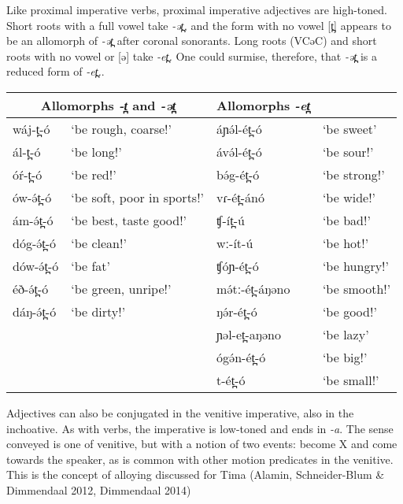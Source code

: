
Like proximal imperative verbs, proximal imperative adjectives are high-toned. Short roots with a full vowel take \textit{-ət̪,} and the form with no vowel [t̪] appears to be an allomorph of \textit{-ət̪ } after coronal sonorants. Long roots (VCəC) and short roots with no vowel or [ə] take \textit{-et̪.} One could surmise, therefore, that \textit{-ət̪ } is a reduced form of \textit{-et̪.}. %

\ea 
\begin{tabular}[t]{llll}
\multicolumn{2}{c}{Allomorphs \textit{-t̪} and \textit{-ət̪}} & Allomorphs \textit{-et̪}\\
\midrule
wáj-t̪-ó  	& ‘be rough, coarse!’ & áɲə́l-ét̪-ó 	& ‘be sweet’\\
ál-t̪-ó  	& ‘be long!’ & ávə́l-ét̪-ó	& ‘be sour!’\\
óŕ-t̪-ó  	& ‘be red!’ & bə́g-ét̪-ó 	& ‘be strong!’\\
ów-ə́t̪-ó  	& ‘be soft, poor in sports!’ & vɾ-ét̪-ánó 	& ‘be wide!’\\
ám-ə́t̪-ó  	& ‘be best, taste good!’ & ʧ-ít̪-ú	 	& ‘be bad!’\\
dóg-ə́t̪-ó  	& ‘be clean!’ & wː-ít-ú 	& ‘be hot!’\\
dów-ə́t̪-ó 	& ‘be fat’ & ʧóɲ-ét̪-ó 	& ‘be hungry!’\\
éð-ə́t̪-ó 	& ‘be green, unripe!’ & mə́tː-ét̪-áŋəno & ‘be smooth!’\\
dáŋ-ə́t̪-ó 	& ‘be dirty!’ & ŋə́r-ét̪-ó	 & ‘be good!’\\
& & ɲəl-et̪-aŋəno & ‘be lazy’\\
& & ógə́n-ét̪-ó 	& ‘be big!’\\
& & t-ét̪-ó 		& ‘be small!’\\
\end{tabular} 
\z 

Adjectives can also be conjugated in the venitive imperative, also in the inchoative. As with verbs, the imperative is low-toned and ends in \textit{-a}. The sense conveyed is one of venitive, but with a notion of two events: become X and come towards the speaker, as is common with other motion predicates in the venitive. This is the concept of alloying discussed for Tima (Alamin, Schneider-Blum & Dimmendaal 2012, Dimmendaal 2014) %

